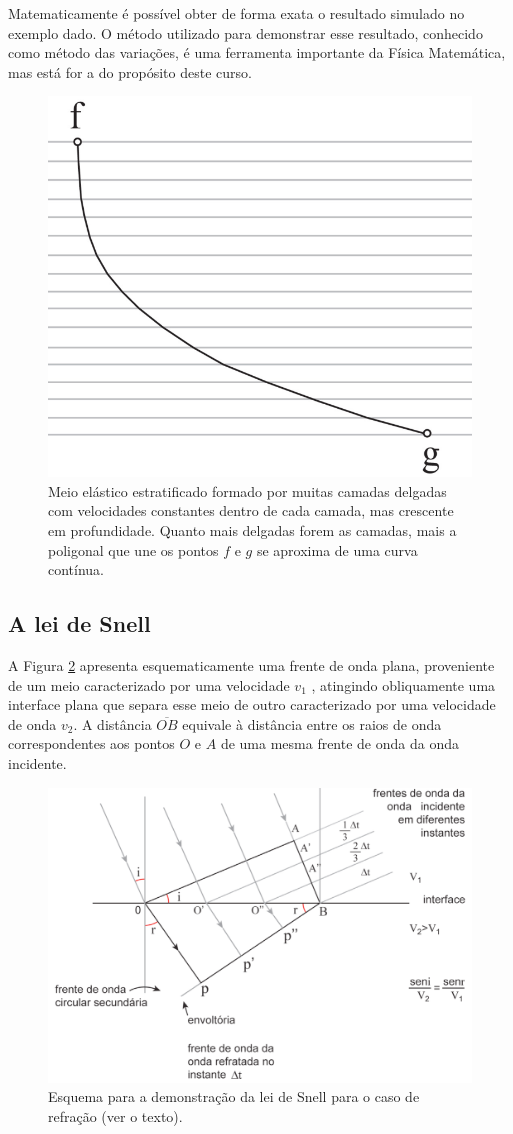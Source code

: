 \documentclass[]{book}
\theoremstyle{definition}
\theoremstyle{definition}
\theoremstyle{definition}
\theoremstyle{remark}
\begin{document}
Matematicamente é possível obter de forma exata o resultado simulado no exemplo dado. O método utilizado para demonstrar esse resultado, conhecido como método das variações, é uma ferramenta importante da Física Matemática, mas está for a do propósito deste curso.

\begin{figure}

{\centering \includegraphics[width=0.5\linewidth]{fig/figU07} 

}

\caption{Meio elástico estratificado formado por muitas camadas delgadas com velocidades constantes dentro de cada camada, mas crescente em profundidade. Quanto mais delgadas forem as camadas, mais a poligonal que une os pontos $f$ e $g$ se aproxima de uma curva contínua.}\label{fig:usp0407}
\end{figure}

\hypertarget{a-lei-de-snell}{%
\subsection{A lei de Snell}\label{a-lei-de-snell}}

A Figura \ref{fig:usp0408} apresenta esquematicamente uma frente de onda plana, proveniente de um meio caracterizado por uma velocidade \(v_1\) , atingindo obliquamente uma interface plana que separa esse meio de outro caracterizado por uma velocidade de onda \(v_2\). A distância \(\overline{OB}\) equivale à distância entre os raios de onda correspondentes aos pontos \(O\) e \(A\) de uma mesma frente de onda da onda incidente.

\begin{figure}

{\centering \includegraphics[width=0.5\linewidth]{fig/figU08} 

}

\caption{Esquema para a demonstração da lei de Snell para o caso de refração (ver o texto).}\label{fig:usp0408}
\end{figure}
\end{document}
